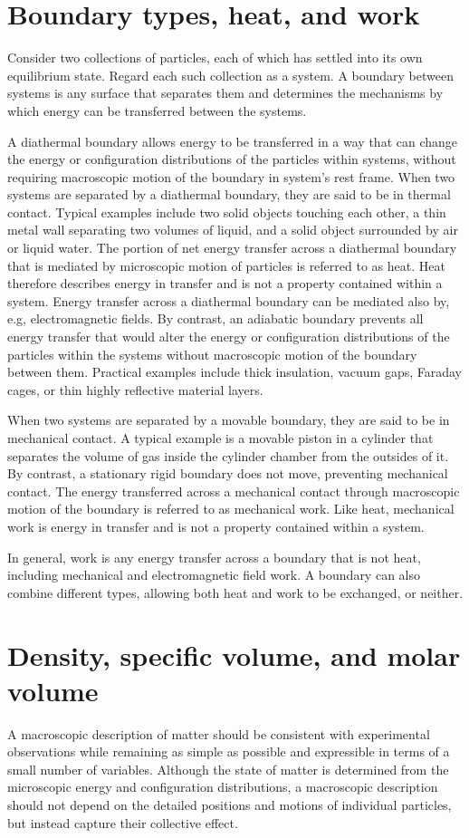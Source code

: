 \section{Boundary types, heat, and work}
Consider two collections of particles, each of which has settled into its own equilibrium state. Regard each such collection as a system. A boundary between systems is any surface that separates them and determines the mechanisms by which energy can be transferred between the systems.

A diathermal boundary allows energy to be transferred in a way that can change the energy or configuration distributions of the particles within systems, without requiring macroscopic motion of the boundary in system's rest frame. When two systems are separated by a diathermal boundary, they are said to be in thermal contact. Typical examples include two solid objects touching each other, a thin metal wall separating two volumes of liquid, and a solid object surrounded by air or liquid water. The portion of net energy transfer across a diathermal boundary that is mediated by microscopic motion of particles is referred to as heat. Heat therefore describes energy in transfer and is not a property contained within a system. Energy transfer across a diathermal boundary can be mediated also by, e.g, electromagnetic fields. By contrast, an adiabatic boundary prevents all energy transfer that would alter the energy or configuration distributions of the particles within the systems without macroscopic motion of the boundary between them. Practical examples include thick insulation, vacuum gaps, Faraday cages, or thin highly reflective material layers.

When two systems are separated by a movable boundary, they are said to be in mechanical contact. A typical example is a movable piston in a cylinder that separates the volume of gas inside the cylinder chamber from the outsides of it. By contrast, a stationary rigid boundary does not move, preventing mechanical contact. The energy transferred across a mechanical contact through macroscopic motion of the boundary is referred to as mechanical work. Like heat, mechanical work is energy in transfer and is not a property contained within a system.

In general, work is any energy transfer across a boundary that is not heat, including mechanical and electromagnetic field work. A boundary can also combine different types, allowing both heat and work to be exchanged, or neither.


\section{Density, specific volume, and molar volume}
A macroscopic description of matter should be consistent with experimental observations while remaining as simple as possible and expressible in terms of a small number of variables. Although the state of matter is determined from the microscopic energy and configuration distributions, a macroscopic description should not depend on the detailed positions and motions of individual particles, but instead capture their collective effect.


